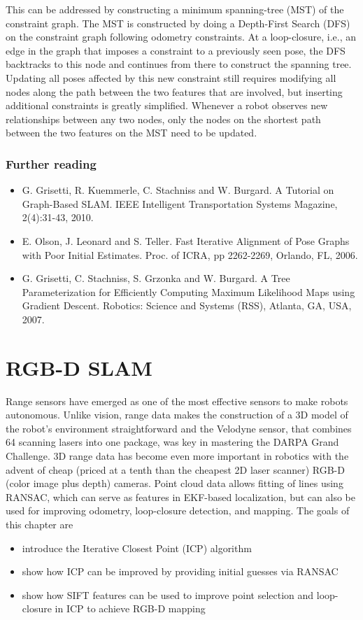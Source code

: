 \documentclass[paper=6.14in:9.21in,pagesize=pdftex,11pt,twoside,openright]{scrbook}
\begin{document}
This can be addressed by constructing a  minimum spanning-tree  (MST) of the constraint graph. The MST is constructed by doing a Depth-First Search (DFS) on the constraint graph following odometry constraints. At a loop-closure, i.e., an edge in the graph that imposes a constraint to a previously seen pose, the DFS backtracks to this node and continues from there to construct the spanning tree. Updating all poses affected by this new constraint still requires modifying all nodes along the path between the two features that are involved, but inserting additional constraints is greatly simplified. Whenever a robot observes new relationships between any two nodes, only the nodes on the shortest path between  the two features on the MST need to be updated. %
\subsection*{Further reading}
\begin{itemize}
\item G. Grisetti, R. Kuemmerle, C. Stachniss and W. Burgard. A Tutorial on Graph-Based SLAM. IEEE Intelligent Transportation Systems Magazine, 2(4):31-43, 2010.

\item E. Olson, J. Leonard and S. Teller. Fast Iterative Alignment of Pose Graphs with Poor Initial Estimates. Proc. of ICRA, pp 2262-2269, Orlando, FL, 2006.

\item G. Grisetti, C. Stachniss, S. Grzonka and W. Burgard. A Tree Parameterization for Efficiently Computing Maximum Likelihood Maps using Gradient Descent. Robotics: Science and Systems (RSS), Atlanta, GA, USA, 2007.
\end{itemize}

\chapter{RGB-D SLAM} 
 Range sensors have emerged as one of the most effective sensors to make robots autonomous. Unlike vision, range data makes the construction of a 3D model of the robot's environment straightforward and the Velodyne sensor, that combines 64 scanning lasers into one package, was key in mastering the DARPA Grand Challenge.  3D range data has become even more important in robotics with the advent of cheap (priced at a tenth than the cheapest 2D laser scanner) RGB-D (color image plus depth) cameras. Point cloud data allows fitting of lines using RANSAC, which can serve as features in EKF-based localization, but can also be used for improving odometry, loop-closure detection, and mapping. The goals of this chapter are
\begin{itemize}
\item introduce the Iterative Closest Point (ICP) algorithm
\item show how ICP can be improved by providing initial guesses via RANSAC
\item show how SIFT features can be used to improve point selection and loop-closure in ICP to achieve RGB-D mapping
\end{itemize}
\end{document}
